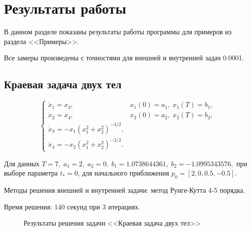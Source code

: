 \documentclass{article}
\begin{document}
\newpage

\section{Результаты работы}

В данном разделе показаны результаты работы программы для примеров из раздела <<Примеры>>.

Все замеры произведены с точностями для внешней и внутренней задач 0.0001.

\subsection{Краевая задача двух тел}

$$
\begin{cases}
	\dot{x}_1=x_3, &x_1(0)=a_1, \;x_1(T)=b_1,
	\\
	\dot{x}_2=x_4, &x_2(0)=a_2, \;x_2(T)=b_2,
	\\
	\dot{x}_3=-x_1(x_1^2+x_2^2)^{-3/2}, 
	\\
	\dot{x}_4=-x_2(x_1^2+x_2^2)^{-3/2}.
\end{cases}	
$$

\noindent Для данных $
T = 7, \; a_1 = 2, \;a_2 = 0, \;b_1 = 1.0738644361, \;b_2 = -1.0995343576,
$
при выборе параметра $t_* = 0$, для начального приближения 
$
p_0 = [2, 0, 0.5, -0.5].
$

Методы решения внешней и внутренней задачи: метод Рунге-Кутта 4-5 порядка.

Время решения: 140 секунд при 3 итерациях.

\begin{figure}[!h]
\caption{Результаты решения задачи <<Краевая задача двух тел>>}
\label{ris:task1}
\end{figure}
\end{document}
